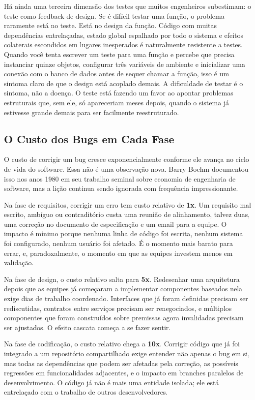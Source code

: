 Há ainda uma terceira dimensão dos testes que muitos engenheiros subestimam: o
teste como feedback de design. Se é difícil testar uma função, o problema
raramente está no teste. Está no design da função. Código com muitas
dependências entrelaçadas, estado global espalhado por todo o sistema e efeitos
colaterais escondidos em lugares inesperados é naturalmente resistente a testes.
Quando você tenta escrever um teste para uma função e percebe que precisa
instanciar quinze objetos, configurar três variáveis de ambiente e inicializar
uma conexão com o banco de dados antes de sequer chamar a função, isso é um
sintoma claro de que o design está acoplado demais. A dificuldade de testar é o
sintoma, não a doença. O teste está fazendo um favor ao apontar problemas
estruturais que, sem ele, só apareceriam meses depois, quando o sistema já
estivesse grande demais para ser facilmente reestruturado.

\subsection{O Custo dos Bugs em Cada Fase}

O custo de corrigir um bug cresce exponencialmente conforme ele avança no ciclo
de vida do software. Essa não é uma observação nova. Barry Boehm documentou
isso nos anos 1980 em seu trabalho seminal sobre economia de engenharia de
software, mas a lição continua sendo ignorada com frequência impressionante.

Na fase de requisitos, corrigir um erro tem custo relativo de \textbf{1x}. Um
requisito mal escrito, ambíguo ou contraditório custa uma reunião de
alinhamento, talvez duas, uma correção no documento de especificação e um email
para a equipe. O impacto é mínimo porque nenhuma linha de código foi escrita,
nenhum sistema foi configurado, nenhum usuário foi afetado. É o momento mais
barato para errar, e, paradoxalmente, o momento em que as equipes investem
menos em validação.

Na fase de design, o custo relativo salta para \textbf{5x}. Redesenhar uma
arquitetura depois que as equipes já começaram a implementar componentes
baseados nela exige dias de trabalho coordenado. Interfaces que já foram
definidas precisam ser rediscutidas, contratos entre serviços precisam ser
renegociados, e múltiplos componentes que foram construídos sobre premissas
agora invalidadas precisam ser ajustados. O efeito cascata começa a se fazer
sentir.

Na fase de codificação, o custo relativo chega a \textbf{10x}. Corrigir código
que já foi integrado a um repositório compartilhado exige entender não apenas o
bug em si, mas todas as dependências que podem ser afetadas pela correção, as
possíveis regressões em funcionalidades adjacentes, e o impacto em branches
paralelos de desenvolvimento. O código já não é mais uma entidade isolada;
ele está entrelaçado com o trabalho de outros desenvolvedores.

